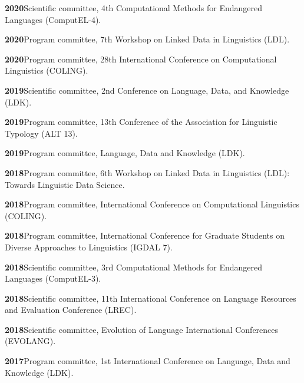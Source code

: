 \documentclass[11pt]{article}
\newcommand{\hangpara}{
 \setlength{\parindent}{0in} %
 \hangindent=0.42in %
}
\begin{document}
\vskip 6pt
\hangpara
{\bf 2020}\hspace{1ex}Scientific committee, 4th Computational Methods for Endangered Languages (ComputEL-4).

\vskip 6pt
\hangpara
{\bf 2020}\hspace{1ex}Program committee, 7th Workshop on Linked Data in Linguistics (LDL).

\vskip 6pt
\hangpara
{\bf 2020}\hspace{1ex}Program committee, 28th International Conference on Computational Linguistics (COLING).

\vskip 6pt
\hangpara
{\bf 2019}\hspace{1ex}Scientific committee, 2nd Conference on Language, Data, and Knowledge (LDK).

\vskip 6pt
\hangpara
{\bf 2019}\hspace{1ex}Program committee, 13th Conference of the Association for Linguistic Typology (ALT 13).

\vskip 6pt
\hangpara
{\bf 2019}\hspace{1ex}Program committee, Language, Data and Knowledge (LDK).

\vskip 6pt
\hangpara
{\bf 2018}\hspace{1ex}Program committee, 6th Workshop on Linked Data in Linguistics (LDL): Towards Linguistic Data Science.

\vskip 6pt
\hangpara
{\bf 2018}\hspace{1ex}Program committee, International Conference on Computational Linguistics (COLING).

\vskip 6pt
\hangpara
{\bf 2018}\hspace{1ex}Program committee, International Conference for Graduate Students on Diverse Approaches to Linguistics (IGDAL 7).

\vskip 6pt
\hangpara
{\bf 2018}\hspace{1ex}Scientific committee, 3rd Computational Methods for Endangered Languages (ComputEL-3).

\vskip 6pt
\hangpara
{\bf 2018}\hspace{1ex}Scientific committee, 11th International Conference on Language Resources and Evaluation Conference (LREC).

\vskip 6pt
\hangpara
{\bf 2018}\hspace{1ex}Scientific committee, Evolution of Language International Conferences (EVOLANG).

\vskip 6pt
\hangpara
{\bf 2017}\hspace{1ex}Program committee, 1st International Conference on Language, Data and Knowledge (LDK).
\end{document}
